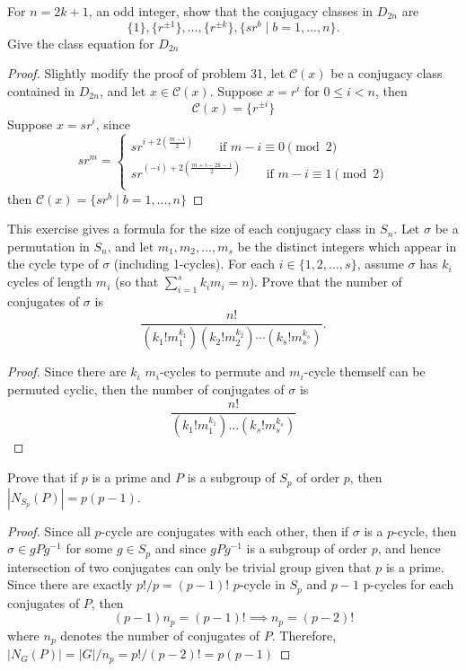 \documentclass{article}
\newenvironment{problem}[2][Problem]{\begin{trivlist}
\item[\hskip \labelsep {\bfseries #1}\hskip \labelsep {\bfseries #2.}]}{\end{trivlist}}
\begin{document}
\begin{problem}{32}
     For \( n = 2k + 1 \), an odd integer, show that the conjugacy classes in \( D_{2n} \) are 
    \[
    \{1\}, \{r^{\pm 1}\}, \ldots, \{r^{\pm k}\}, \{sr^b \mid b = 1, \ldots, n\}.
    \]
    Give the class equation for \( D_{2n} \)
\end{problem}
\begin{proof}
    Slightly modify the proof of problem 31, let $\mathcal{C}(x)$ be a conjugacy class contained in $D_{2n}$, and let $x \in \mathcal{C}(x)$. Suppose $x=r^i$ for $0\leq i <n$, then 
    \[
    \mathcal{C}(x)=\{r^{\pm i}\}
    \]
    Suppose $x=sr^i$, since 
    \[
        sr^m = \begin{cases}
            sr^{i+2(\frac{m-i}{2})}\qquad\text{if }m-i\equiv 0 \pmod{2}\\
            sr^{(-i)+2(\frac{m+i-2k-1}{2})}\qquad\text{if }m-i\equiv 1\pmod{2}\\
        \end{cases}
    \]
    then $\mathcal{C}(x)=\{sr^b\mid b=1, ..., n\}$
\end{proof}
\begin{problem}{33}
    This exercise gives a formula for the size of each conjugacy class in \( S_n \). Let \( \sigma \) be a permutation in \( S_n \), and let \( m_1, m_2, \ldots, m_s \) be the distinct integers which appear in the cycle type of \( \sigma \) (including 1-cycles). For each \( i \in \{1, 2, \ldots, s\} \), assume \( \sigma \) has \( k_i \) cycles of length \( m_i \) (so that \( \sum_{i=1}^s k_i m_i = n \)). Prove that the number of conjugates of \( \sigma \) is 
    \[
    \frac{n!}{(k_1! m_1^{k_1})(k_2! m_2^{k_2}) \cdots (k_s! m_s^{k_s})}.
    \]
\end{problem}
\begin{proof}
    Since there are $k_i$ $m_i$-cycles to permute and $m_i$-cycle themself can be permuted cyclic, then the number of conjugates of \( \sigma \) is
    \[
        \frac{n!}{(k_1!m_1^{k_1})\dots (k_s!m_s^{k_s})}
    \]
\end{proof}
\begin{problem}{34}
Prove that if $p$ is a prime and $P$ is a subgroup of $S_p$ of order $p$, then 
 $|N_{S_p}(P)| = p(p-1)$.   
\end{problem}
\begin{proof}
    Since all $p$-cycle are conjugates with each other, then if $\sigma$ is a $p$-cycle, then $\sigma \in gPg^{-1}$ for some $g \in S_p$ and since $gPg^{-1}$ is a subgroup of order $p$, and hence intersection of two conjugates can only be trivial group given that $p$ is a prime. Since there are exactly $p!/p=(p-1)!$ $p$-cycle in $S_p$ and $p-1$ p-cycles for each conjugates of $P$, then
    \[
        (p-1)n_p=(p-1)! \implies n_p =(p-2)!
    \]
    where $n_p$ denotes the number of conjugates of $P$. Therefore, $|N_G(P)|=|G|/n_p=p!/(p-2)!=p(p-1)$
\end{proof}
\end{document}
